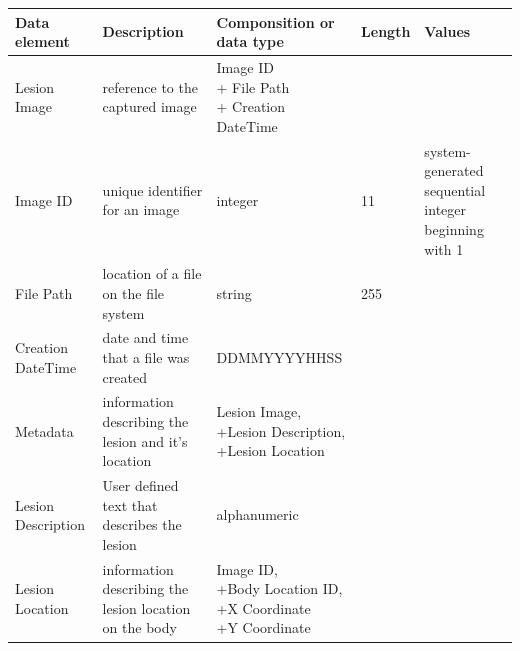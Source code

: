                 \begin{longtable}[H]{ | l | p{3.0cm} | p{2.5cm} | p{1.0cm} | p{2.5cm} | }

                    \hline
                    \textbf{Data element} & \textbf{Description} & \textbf{Componsition or data type} & \textbf{Length} & \textbf{Values} \\ \hline

                    Lesion Image & reference to the captured image &

                        \specialcell[t]{Image ID
                           \\ + File Path
                           \\ + Creation DateTime
                        }

                     & & \\ \hline

                    Image ID & unique identifier for an image &
                    integer & 11 & system-generated sequential integer beginning with 1 \\ \hline

                    File Path & location of a file on the file system &
                    string & 255 &  \\ \hline

                    Creation DateTime & date and time that a file was created &
                    DDMMYYYYHHSS &  &  \\ \hline

                    Metadata & information describing the lesion and it's location &

                        \specialcell[t]{Lesion Image,
                           \\ +Lesion Description,
                           \\ +Lesion Location
                        }

                     & & \\ \hline

                    Lesion Description & User defined text that describes the lesion &
                    alphanumeric &  &  \\ \hline

                    Lesion Location & information describing the lesion location on the body &

                        \specialcell[t]{Image ID,
                           \\ +Body Location ID,
                           \\ +X Coordinate
                           \\ +Y Coordinate
                        }


\end{longtable}
